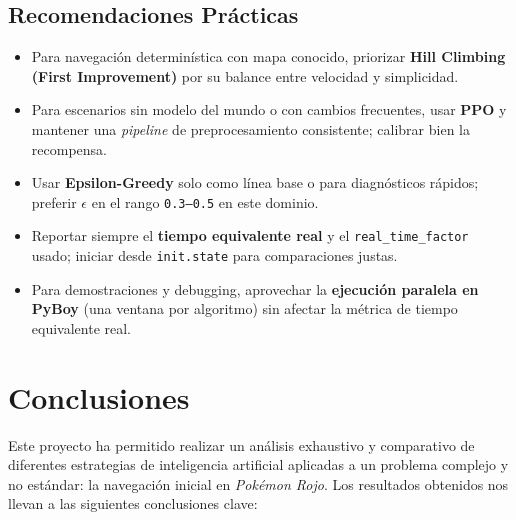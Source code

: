 \documentclass[12pt, oneside, openany]{book}
\begin{document}
\subsection{Recomendaciones Prácticas}
\label{sec:recomendaciones}
\begin{itemize}[leftmargin=*]
    \item Para navegación determinística con mapa conocido, priorizar \textbf{Hill Climbing (First Improvement)} por su balance entre velocidad y simplicidad.
    \item Para escenarios sin modelo del mundo o con cambios frecuentes, usar \textbf{PPO} y mantener una \textit{pipeline} de preprocesamiento consistente; calibrar bien la recompensa.
    \item Usar \textbf{Epsilon-Greedy} solo como línea base o para diagnósticos rápidos; preferir $\epsilon$ en el rango \texttt{0.3--0.5} en este dominio.
    \item Reportar siempre el \textbf{tiempo equivalente real} y el \texttt{real\_time\_factor} usado; iniciar desde \texttt{init.state} para comparaciones justas.
    \item Para demostraciones y debugging, aprovechar la \textbf{ejecución paralela en PyBoy} (una ventana por algoritmo) sin afectar la métrica de tiempo equivalente real.
\end{itemize}

\section{Conclusiones}
\label{sec:conclusiones}

Este proyecto ha permitido realizar un análisis exhaustivo y comparativo de diferentes estrategias de inteligencia artificial aplicadas a un problema complejo y no estándar: la navegación inicial en \textit{Pokémon Rojo}. Los resultados obtenidos nos llevan a las siguientes conclusiones clave:
\end{document}
